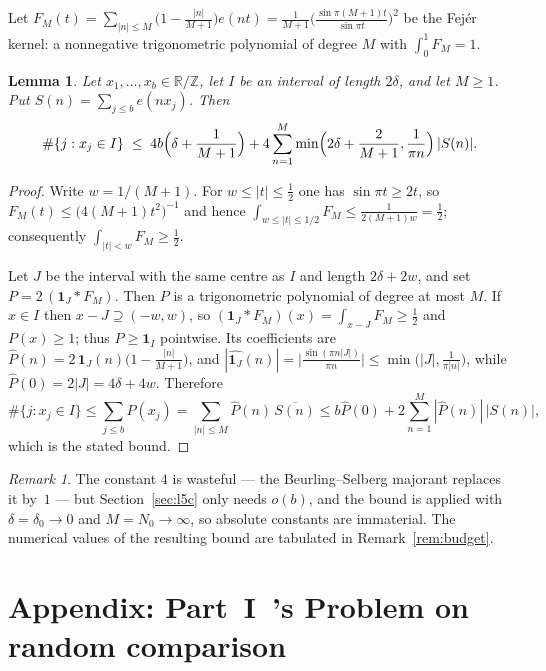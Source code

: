 \documentclass[11pt,a4paper]{article}
\theoremstyle{plain}
\newtheorem{lemma}[theorem]{Lemma}
\theoremstyle{definition}
\theoremstyle{remark}
\newtheorem{remark}[theorem]{Remark}
\begin{document}
Let $F_M(t)=\sum_{|n|\le M}\bigl(1-\tfrac{|n|}{M+1}\bigr)e(nt)
=\tfrac{1}{M+1}\bigl(\tfrac{\sin\pi(M+1)t}{\sin\pi t}\bigr)^{2}$ be the Fej\'er
kernel: a nonnegative trigonometric polynomial of degree $M$ with
$\int_{0}^{1}F_M=1$.

\begin{lemma}\label{lem:fejer}
Let $x_1,\dots,x_b\in\mathbb{R}/\mathbb{Z}$, let $I$ be an interval of length
$2\delta$, and let $M\ge1$. Put $S(n)=\sum_{j\le b}e(nx_j)$. Then
\[
  \#\{j:x_j\in I\}\;\le\;4b\Bigl(\delta+\frac{1}{M+1}\Bigr)
   +4\sum_{n=1}^{M}\min\Bigl(2\delta+\frac{2}{M+1},\frac{1}{\pi n}\Bigr)\,|S(n)| .
\]
\end{lemma}

\begin{proof}
Write $w=1/(M+1)$. For $w\le|t|\le\tfrac12$ one has $\sin\pi t\ge2t$, so
$F_M(t)\le\bigl(4(M+1)t^{2}\bigr)^{-1}$ and hence
$\int_{w\le|t|\le1/2}F_M\le\tfrac{1}{2(M+1)w}=\tfrac12$; consequently
$\int_{|t|<w}F_M\ge\tfrac12$.

Let $J$ be the interval with the same centre as $I$ and length $2\delta+2w$, and
set $P=2\,(\mathbf{1}_J*F_M)$. Then $P$ is a trigonometric polynomial of degree
at most $M$. If $x\in I$ then $x-J\supseteq(-w,w)$, so
$(\mathbf{1}_J*F_M)(x)=\int_{x-J}F_M\ge\tfrac12$ and $P(x)\ge1$; thus
$P\ge\mathbf{1}_I$ pointwise. Its coefficients are
$\widehat P(n)=2\,\widehat{\mathbf{1}_J}(n)\bigl(1-\tfrac{|n|}{M+1}\bigr)$, and
$|\widehat{\mathbf{1}_J}(n)|=\bigl|\tfrac{\sin(\pi n|J|)}{\pi n}\bigr|
\le\min\bigl(|J|,\tfrac{1}{\pi|n|}\bigr)$, while
$\widehat P(0)=2|J|=4\delta+4w$. Therefore
\[
  \#\{j:x_j\in I\}\le\sum_{j\le b}P(x_j)
  =\sum_{|n|\le M}\widehat P(n)\,\overline{S(n)}
  \le b\widehat P(0)+2\sum_{n=1}^{M}|\widehat P(n)|\,|S(n)|,
\]
which is the stated bound.
\end{proof}

\begin{remark}
The constant $4$ is wasteful --- the Beurling--Selberg majorant replaces it
by~$1$ --- but Section~\ref{sec:l5c} only needs $o(b)$, and the bound is applied
with $\delta=\delta_0\to0$ and $M=N_0\to\infty$, so absolute constants are
immaterial. The numerical values of the resulting bound are tabulated in
Remark~\ref{rem:budget}.
\end{remark}

\section{Appendix: Part~I~\cite{P1}'s Problem on random comparison}
\label{sec:p5}
\end{document}
